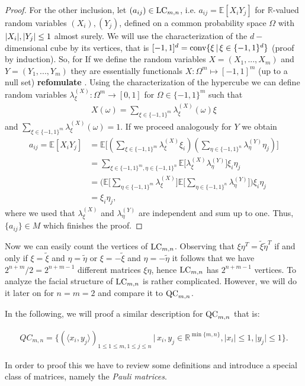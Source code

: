 \begin{proof}
	For the other inclusion, let $ (a_{ij}) \in \textup{LC}_{m,n} $, i.e. $ a_{ij} = \mathbb{E}[X_iY_j] $ for $ \mathbb{R} $-valued random variables $ (X_i),(Y_j) $, defined on a common probability space $ \Omega $ with $ {\left|{X_i}\right|},{\left|{Y_j}\right|} \le 1 $ almost surely. 
	We will use the characterization of the $ d-$dimensional cube by its vertices, that is $ [-1,1]^d = \textup{conv} \{\xi \, | \, \xi \in \{-1,1 \}^d \}$ (proof by induction). So, for 
	If we define the random variables $ X= (X_1,...,X_m) $ and $ Y= (Y_1,...,Y_m) $ they are essentially functionals 
	$ X: \Omega^m \mapsto [-1,1]^m $ (up to a null set) {\textbf{refomulate }}. Using the characterization of the hypercube we can define random variables $ \lambda_{\xi}^{(X)}: \Omega^m \to [0,1] $ for $ \Omega \in \{-1,1\}^m $ such that 
	\begin{align*}
		X(\omega) = \sum_{\xi \in \{-1,1\}^m}\lambda_{\xi}^{(X)}(\omega)\xi
	\end{align*} 
	and $ \sum_{\xi \in \{-1,1\}^m}\lambda_{\xi}^{(X)}(\omega) = 1  $. 
	If we proceed analogously for $ Y $ we obtain
	\begin{align*}
		a_{ij} = \mathbb{E}[X_iY_j] &= \mathbb{E} \big [  (\sum_{\xi \in \{-1,1\}^m}\lambda_{\xi}^{(X)}\xi_i ) (\sum_{\eta \in \{-1,1\}^n}\lambda_{\eta}^{(Y)}\eta_j ) \big ]   \\
		&= \sum_{\xi \in \{-1,1\}^m, \eta \in \{-1,1\}^n} \mathbb{E}\big [\lambda_{\xi}^{(X)}\lambda_{\eta}^{(Y)} \big ] \xi_i \eta_j  \\
		&=\Big ( \mathbb{E}\big [\sum_{\eta \in \{-1,1\}^m}\lambda_{\xi}^{(X)} \big ] \mathbb{E}\big [\sum_{\eta \in \{-1,1\}^n}\lambda_{\eta}^{(Y)} \big ] \Big ) \xi_i \eta_j  \\
		&= \xi_i\eta_j,
	\end{align*}
	where we used that $ \lambda_{\xi}^{(X)} $ and $ \lambda_{\eta}^{(Y)} $ are independent and sum up to one. 
	Thus, $ \{ a_{ij}\} \in M $ which finishes the proof. 
\end{proof}
Now we can easily count the vertices of $ \textup{LC}_{m,n} $. Observing that $ \xi \eta^T = \tilde{\xi} \tilde{\eta}^T $ if and only if $ \xi = \tilde{\xi} $ and $ \eta = \tilde{\eta} $ or $ \xi = -\tilde{\xi} $ and $ \eta = -\tilde{\eta} $ it follows that we have $ 2^{n+m}/2 = 2^{n+m-1} $ different matrices $ \xi \eta $, hence $ \textup{LC}_{m,n} $ has $ 2^{n+m-1} $ vertices. To analyze the facial structure of $ \textup{LC}_{m,n} $ is rather complicated. 
However, we will do it later on for $ n=m=2 $ and compare it to $ \textup{QC}_{m,n} $.

In the following, we will proof a similar description for $ \textup{QC}_{m,n} $ that is: 
\begin{lemma}\label{LemQC}
	\begin{align*}\label{EqQC}
		QC_{m,n} = \{ (\langle x_i,y_j \rangle)_{1 \le 1 \le m, 1 \le j \le n} \,| \, x_i,y_j \in \mathbb{R}^{ \min \{m,n \} }, \vert x_i  \vert \le 1, \vert y_j \vert \le 1  \}.
	\end{align*}
\end{lemma}
In order to proof this we have to review some definitions and introduce a special class of matrices, namely the {\itshape Pauli matrices}.


